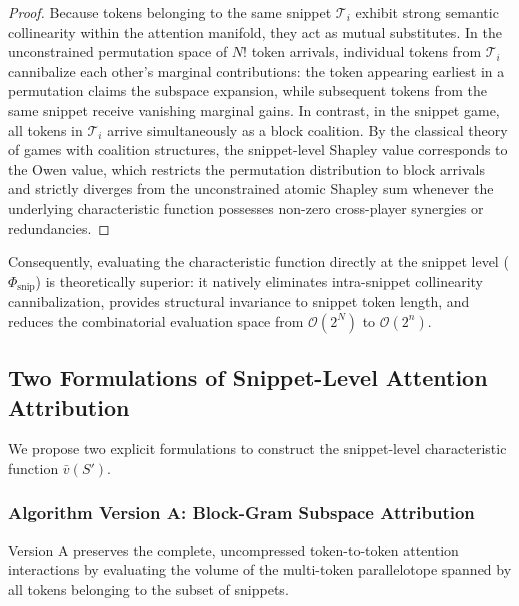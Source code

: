 \documentclass{article}
\begin{document}
\begin{proof}
Because tokens belonging to the same snippet $\mathcal{T}_i$ exhibit strong semantic collinearity within the attention manifold, they act as mutual substitutes. In the unconstrained permutation space of $N!$ token arrivals, individual tokens from $\mathcal{T}_i$ cannibalize each other's marginal contributions: the token appearing earliest in a permutation claims the subspace expansion, while subsequent tokens from the same snippet receive vanishing marginal gains. In contrast, in the snippet game, all tokens in $\mathcal{T}_i$ arrive simultaneously as a block coalition. By the classical theory of games with coalition structures, the snippet-level Shapley value corresponds to the Owen value, which restricts the permutation distribution to block arrivals and strictly diverges from the unconstrained atomic Shapley sum whenever the underlying characteristic function possesses non-zero cross-player synergies or redundancies.
\end{proof}

Consequently, evaluating the characteristic function directly at the snippet level ($\Phi_{\text{snip}}$) is theoretically superior: it natively eliminates intra-snippet collinearity cannibalization, provides structural invariance to snippet token length, and reduces the combinatorial evaluation space from $\mathcal{O}(2^N)$ to $\mathcal{O}(2^n)$.

\subsection{Two Formulations of Snippet-Level Attention Attribution}

We propose two explicit formulations to construct the snippet-level characteristic function $\bar{v}(S')$.

\subsubsection{Algorithm Version A: Block-Gram Subspace Attribution}
Version A preserves the complete, uncompressed token-to-token attention interactions by evaluating the volume of the multi-token parallelotope spanned by all tokens belonging to the subset of snippets.
\end{document}
